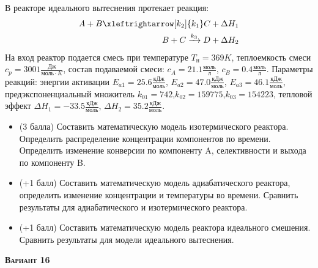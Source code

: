  В реакторе идеального вытеснения протекает реакция: \begin{equation*} \begin{aligned} A+B \xleftrightarrow[k_2]{k_1} C + \Delta H_1 \\ B + C \xrightarrow{k_3} D + \Delta H_2 \end{aligned} \end{equation*}                                На вход  реактор подается смесь при температуре $ T_н =  369 K$, теплоемкость смеси $c_p= 3001 \frac{Дж}{моль \cdot K}$, состав подаваемой смеси: $c_A=21.1 \frac{моль}{л}$, $c_B=0.4 \frac{моль}{л}$. Параметры реакций: энергии активации $E_{a1}=25.6 \frac{кДж}{моль}$, $E_{a2}=47.0  \frac{кДж}{моль}$, $E_{a3}=46.1  \frac{кДж}{моль}$, предэкспоненциальный множитель $k_{01}=       742$,$k_{02}=    159775$,$k_{03}=    154223$, тепловой эффект $\Delta H_1= -33.5  \frac{кДж}{моль}$, $\Delta H_2=35.2 \frac{кДж}{моль}$.\begin{itemize} \item (3 балла) Составить математическую модель изотермического реактора. Определить распределение концентрации компонентов по времени. Определить изменение конверсии по компоненту A, селективности и выхода по компоненту B. \item (+1 балл) Составить математическую модель адиабатического реактора, определить изменение концентрации и температуры во времени. Сравнить результаты для адиабатического и изотермического реактора. \item (+1 балл) Составить математическую модель реактора идеального смешения. Сравнить результаты для модели идеального вытеснения. \end{itemize}

\textsc{\textbf{Вариант 16}}

